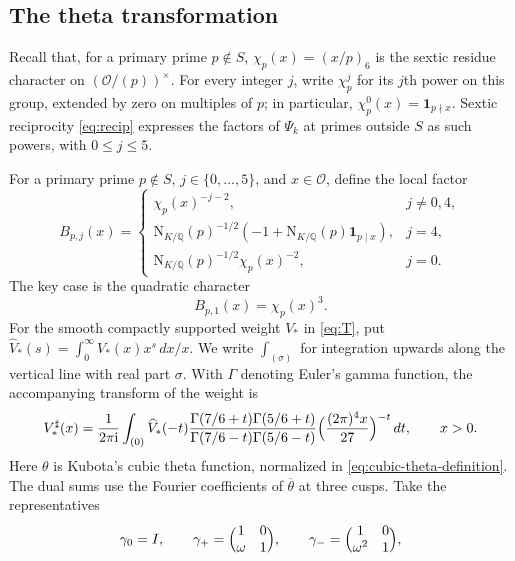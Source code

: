 \documentclass[11pt,a4paper]{article}
\numberwithin{equation}{section}
\numberwithin{figure}{section}
\theoremstyle{definition}
\theoremstyle{remark}
\newcommand{\Q}{\mathbb Q}
\newcommand{\NK}{\mathrm N_{K/\Q}}
\newcommand{\OO}{\mathcal O}
\newcommand{\ind}{\mathbf1}
\newcommand{\dd}{\,d}
\begin{document}
\subsection{The theta transformation}
Recall that, for a primary prime $p\notin S$,
$\chi_p(x)=(x/p)_6$ is the sextic residue character on
$(\OO/(p))^\times$. For every integer $j$, write $\chi_p^j$ for
its $j$th power on this group, extended by zero on multiples of $p$;
in particular, $\chi_p^0(x)=\ind_{p\nmid x}$.
Sextic reciprocity \eqref{eq:recip} expresses the factors of
$\Psi_k$ at primes outside $S$ as such powers, with $0\le j\le5$.



For a primary prime $p\notin S$, $j\in\{0,\ldots,5\}$, and $x\in\OO$,
define the local factor
\begin{equation}\label{eq:theta-local-factors}
 B_{p,j}(x)=
 \begin{cases}
  \chi_p(x)^{-j-2},&j\ne0,4,\\
  \NK(p)^{-1/2}(-1+\NK(p)\ind_{p\mid x}),&j=4,\\
  \NK(p)^{-1/2}\chi_p(x)^{-2},&j=0.
 \end{cases}
\end{equation}
The key case is the quadratic character
\[
 B_{p,1}(x)=\chi_p(x)^3.
\]
For the smooth compactly supported weight $V_*$ in \eqref{eq:T},
put $\widehat V_*(s)=\int_0^\infty V_*(x)x^s\dd x/x$.
We write $\int_{(\sigma)}$ for integration upwards along the
vertical line with real part $\sigma$.
With $\Gamma$ denoting Euler's gamma function, the accompanying transform of the weight is
\begin{equation}\label{eq:theta-weight}
 V_*^\sharp(x)=\frac1{2\pi\mathrm i}\int_{(0)}
 \widehat V_*(-t)
 \frac{\Gamma(7/6+t)\Gamma(5/6+t)}
      {\Gamma(7/6-t)\Gamma(5/6-t)}
 \Bigl(\frac{(2\pi)^4x}{27}\Bigr)^{-t}\dd t,\qquad x>0.
\end{equation}
Here $\theta$ is Kubota's cubic theta function, normalized in
\eqref{eq:cubic-theta-definition}. The dual sums use the Fourier
coefficients of $\overline\theta$ at three cusps. Take the representatives
\begin{equation}\label{eq:theta-cusp-representatives}
 \gamma_0=I,\qquad
 \gamma_+=\Bigl(\begin{matrix}1&0\\\omega&1\end{matrix}\Bigr),\qquad
 \gamma_-=\Bigl(\begin{matrix}1&0\\\omega^2&1\end{matrix}\Bigr),
\end{equation}
\end{document}
